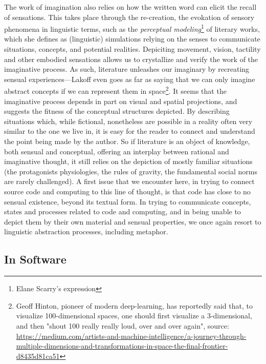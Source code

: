 \documentclass{article}
\begin{document}
The work of imagination also relies on how the written word can elicit the recall of sensations. This takes place through the re-creation, the evokation of sensory phenomena in linguistic terms, such as the \emph{perceptual modeling}\footnote{Elane Scarry's expression} of literary works, which she defines as (linguistic) simulations relying on the senses to communicate situations, concepts, and potential realities. Depiciting movement, vision, tactility and other embodied sensations allows us to crystallize and verify the work of the imaginative process. As such, literature unleashes our imaginary by recreating sensual experiences—Lakoff even goes as far as saying that we can only imagine abstract concepts if we can represent them in space\footnote{Geoff Hinton, pioneer of modern deep-learning, has reportedly said that, to visualize 100-dimensional spaces, one should first visualize a 3-dimensional, and then "shout 100 really really loud, over and over again", source: \url{https://medium.com/artists-and-machine-intelligence/a-journey-through-multiple-dimensions-and-transformations-in-space-the-final-frontier-d8435d81ca51}}. It seems that the imaginative process depends in part on visual and spatial projections, and suggests the fitness of the conceptual structures depicted. By describing situations which, while fictional, nonetheless are possible in a reality often very similar to the one we live in, it is easy for the reader to connect and understand the point being made by the author. So if literature is an object of knowledge, both sensual and conceptual, offering an interplay between rational and imaginative thought, it still relies on the depiction of mostly familiar situations (the protagonists physiologies, the rules of gravity, the fundamental social norms are rarely challenged). A first issue that we encounter here, in trying to connect source code and computing to this line of thought, is that code has close to no sensual existence, beyond its textual form. In trying to communicate concepts, states and processes related to code and computing, and in being unable to depict them by their own material and sensual properties, we once again resort to linguistic abstraction processes, including metaphor.

\subsection{In Software}
\end{document}
